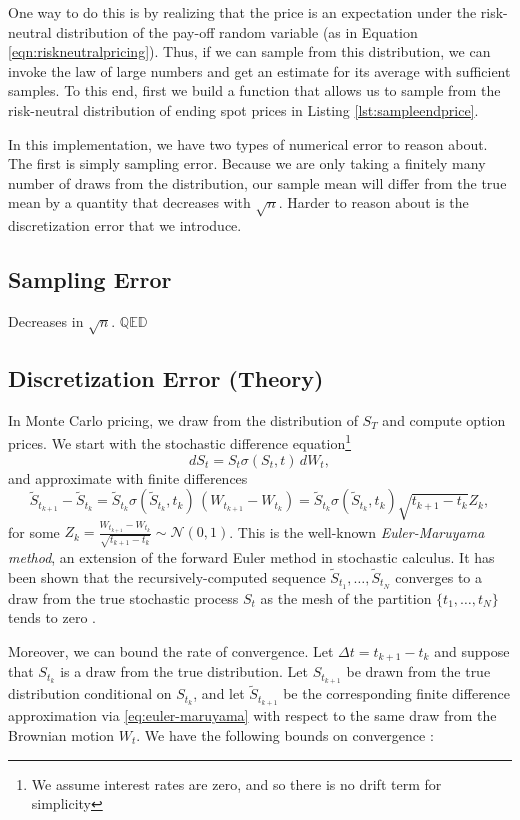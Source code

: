 \documentclass[12pt]{article}
\numberwithin{equation}{section}
\newcommand{\Norm}{\mathcal N}
\begin{document}
One way to do this is by realizing that the price is an expectation under the
risk-neutral distribution of the pay-off random variable (as in Equation
\ref{eqn:riskneutralpricing}). Thus, if we can sample
from this distribution, we can invoke the law of large numbers and get an
estimate for its average with sufficient samples. To this end, first we build a
function that allows us to sample from the risk-neutral distribution of ending
spot prices in Listing \ref{lst:sampleendprice}.

In this implementation, we have two types of numerical error to reason about.
The first is simply sampling error. Because we are only taking a finitely many
number of draws from the distribution, our sample mean will differ from the true
mean by a quantity that decreases with $\sqrt{n}$. Harder to reason about is the
discretization error that we introduce. 

\subsection{Sampling Error}

Decreases in $\sqrt{n}$. $\mathbb{QED}$

\subsection{Discretization Error (Theory)}
In Monte Carlo pricing, we draw from the distribution of $S_T$ and compute
option prices. We start with the stochastic difference equation\footnote{We
assume interest rates are zero, and so there is no drift term for simplicity}
\[ dS_t = S_t \sigma(S_t,t) \, dW_t, \]
and approximate with finite differences 
\begin{equation}
    \label{eq:euler-maruyama}
    \tilde S_{t_{k+1}} - \tilde S_{t_k} = \tilde S_{t_k} \sigma(\tilde S_{t_k},
t_k)\, (W_{t_{k+1}} - W_{t_k}) = \tilde S_{t_k} \sigma(\tilde S_{t_k}, t_k)
\sqrt{t_{k+1}-t_k} Z_k,
\end{equation}
for some $Z_k = \frac{W_{t_{k+1}} - W_{t_k}}{\sqrt{t_{k+1}-t_k}} \sim
\Norm(0,1)$. This is the well-known \emph{Euler-Maruyama method}, an extension
of the forward Euler method in stochastic calculus. It has been shown that the
recursively-computed sequence $\tilde S_{t_1},\ldots, \tilde S_{t_N}$ converges
to a draw from the true stochastic process $S_t$ as the mesh of the partition
$\{t_1,\ldots,t_N\}$ tends to zero \citep{dobrow2016introduction}.  

Moreover, we can bound the rate of convergence. Let $\Delta t = t_{k+1} - t_k$
and suppose that $S_{t_k}$ is a draw from the true distribution. Let
$S_{t_{k+1}}$ be drawn from the true distribution conditional on $S_{t_k}$, and
let $\tilde S_{t_{k+1}}$ be the corresponding finite difference approximation
via \eqref{eq:euler-maruyama} with respect to the same draw from the Brownian
motion $W_t$. We have the following bounds on convergence
\citep{higham2001algorithmic}:
\end{document}
